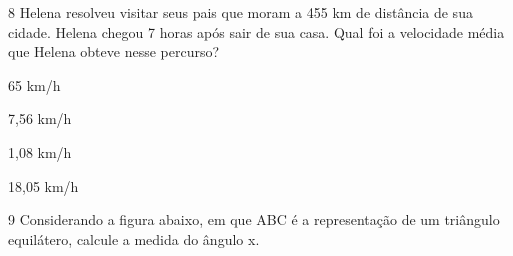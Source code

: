 






\num{8} Helena resolveu visitar seus pais que moram a 455 km de distância de
sua cidade. Helena chegou 7 horas após sair de sua casa. Qual foi a
velocidade média que Helena obteve nesse percurso?

\begin{escolha}
\item 65 km/h
\item 7,56 km/h
\item 1,08 km/h
\item 18,05 km/h
\end{escolha}








\num{9} Considerando a figura abaixo, em que ABC é a representação de um
triângulo equilátero, calcule a medida do ângulo x.

